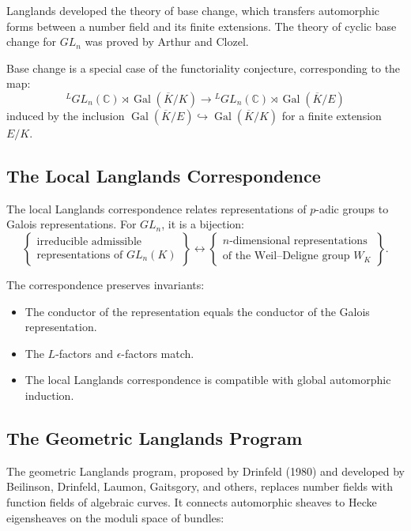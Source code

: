 Langlands developed the theory of base change, which transfers automorphic forms between a number field and its finite extensions. The theory of cyclic base change for $GL_n$ was proved by Arthur and Clozel.

Base change is a special case of the functoriality conjecture, corresponding to the map:
\[
{}^L GL_n(\mathbb{C}) \rtimes \operatorname{Gal}(\overline{K}/K) \to {}^L GL_n(\mathbb{C}) \rtimes \operatorname{Gal}(\overline{K}/E)
\]
induced by the inclusion $\operatorname{Gal}(\overline{K}/E) \hookrightarrow \operatorname{Gal}(\overline{K}/K)$ for a finite extension $E/K$.

\subsection{The Local Langlands Correspondence}

The local Langlands correspondence relates representations of $p$-adic groups to Galois representations. For $GL_n$, it is a bijection:
\[
\left\{
\begin{array}{c}
\text{irreducible admissible} \\
\text{representations of } GL_n(K)
\end{array}
\right\} \longleftrightarrow \left\{
\begin{array}{c}
n\text{-dimensional representations} \\
\text{of the Weil--Deligne group } W_K
\end{array}
\right\}.
\]

The correspondence preserves invariants:
\begin{itemize}
\item The conductor of the representation equals the conductor of the Galois representation.
\item The $L$-factors and $\epsilon$-factors match.
\item The local Langlands correspondence is compatible with global automorphic induction.
\end{itemize}

\subsection{The Geometric Langlands Program}

The geometric Langlands program, proposed by Drinfeld (1980) and developed by Beilinson, Drinfeld, Laumon, Gaitsgory, and others, replaces number fields with function fields of algebraic curves. It connects automorphic sheaves to Hecke eigensheaves on the moduli space of bundles:

